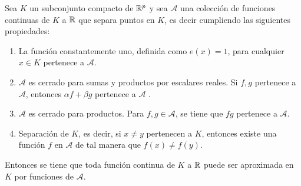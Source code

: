 \begin{teorema} 

    Sea $K$ un subconjunto compacto de $\mathbb{R}^p$ y sea $\mathcal{A}$ una colección de 
    funciones continuas de $K$ a $\mathbb{R}$ 
    que separa puntos en $K$, es decir cumpliendo las siguientes propiedades: 

    \begin{enumerate}
        \item La función constantemente uno, definida como $e(x)=1$, para cualquier $x\in K$ pertenece a $\mathcal{A}$.
        \item $\mathcal{A}$ es cerrado para sumas y productos por escalares reales. Si $f,g$ pertenece a  $\mathcal{A}$, entonces $\alpha f + \beta g$ pertenece a $\mathcal{A}$ . 
        \item $\mathcal{A}$ es cerrado para productos. Para $f,g \in \mathcal A$, se tiene que $fg$ pertenece a $\mathcal{A}$. 
        \item Separación de $K$, es decir, si $x \neq y$ pertenecen a $K$, entonces existe una función $f$ en $\mathcal{A}$  de tal manera que $f(x) \neq f(y)$. 
    \end{enumerate}
    
    Entonces se tiene que toda función continua de $K$ a $\mathbb{R}$ puede ser aproximada en $K$ por funciones de $\mathcal A$. 

\end{teorema}  

